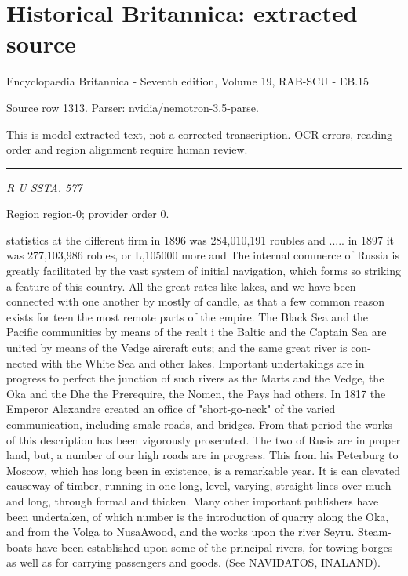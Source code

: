 \documentclass[11pt]{article}
\begin{document}
\section*{Historical Britannica: extracted source}
Encyclopaedia Britannica - Seventh edition, Volume 19, RAB-SCU - EB.15\par
{\small Source row 1313. Parser: nvidia/nemotron-3.5-parse.\par}
{\small This is model-extracted text, not a corrected transcription. OCR errors, reading order and region alignment require human review.\par}
\hrule\medskip
{\small\itshape R U SSTA. 577\par}

{\scriptsize\color{gray} Region region-0; provider order 0.\par}
\medskip

statistics at the different firm in 1896 was 284,010,191 roubles and ..... in 1897 it was 277,103,986 robles, or L,105000 more and The internal commerce of Russia is greatly facilitated by the vast system of initial navigation, which forms so striking a feature of this country. All the great rates like lakes, and we have been connected with one another by mostly of candle, as that a few common reason exists for teen the most remote parts of the empire. The Black Sea and the Pacific communities by means of the realt i the Baltic and the Captain Sea are united by means of the Vedge aircraft cuts; and the same great river is con- nected with the White Sea and other lakes. Important undertakings are in progress to perfect the junction of such rivers as the Marts and the Vedge, the Oka and the Dhe the Prerequire, the Nomen, the Pays had others. In 1817 the Emperor Alexandre created an office of "short-go-neck" of the varied communication, including smale roads, and bridges. From that period the works of this description has been vigorously prosecuted. The two of Rusis are in proper land, but, a number of our high roads are in progress. This from his Peterburg to Moscow, which has long been in existence, is a remarkable year. It is can clevated causeway of timber, running in one long, level, varying, straight lines over much and long, through formal and thicken. Many other important publishers have been undertaken, of which number is the introduction of quarry along the Oka, and from the Volga to NusaAwood, and the works upon the river Seyru. Steam-boats have been established upon some of the principal rivers, for towing borges as well as for carrying passengers and goods. (See NAVIDATOS, INALAND).
\par
\end{document}

